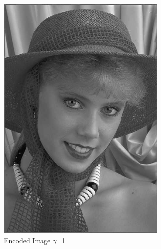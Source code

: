 \documentclass{article}
\begin{document}
\begin{figure}[!htb]
\begin{subfigure}{0.33\textwidth}
					\includegraphics[width=0.9\textwidth]{img03y_2.jpeg}
					\caption{Encoded Image $\gamma$=1}
				\end{subfigure}
				\begin{subfigure}{0.33\textwidth}

\end{subfigure}
\end{figure}
\end{document}
